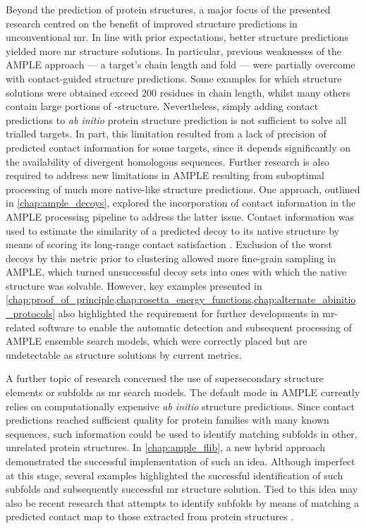Beyond the prediction of protein structures, a major focus of the presented research centred on the benefit of improved structure predictions in unconventional \gls{mr}. In line with prior expectations, better structure predictions yielded more \gls{mr} structure solutions. In particular, previous weaknesses of the AMPLE approach --- a target's chain length and fold --- were partially overcome with contact-guided structure predictions. Some examples for which structure solutions were obtained exceed 200 residues in chain length, whilst many others contain large portions of \textbeta-structure. Nevertheless, simply adding contact predictions to \textit{ab initio} protein structure prediction is not sufficient to solve all trialled targets. In part, this limitation resulted from a lack of precision of predicted contact information for some targets, since it depends significantly on the availability of divergent homologous sequences. Further research is also required to address new limitations in AMPLE resulting from suboptimal processing of much more native-like structure predictions. One approach, outlined in \cref{chap:ample_decoys}, explored the incorporation of contact information in the AMPLE processing pipeline to address the latter issue. Contact information was used to estimate the similarity of a predicted decoy to its native structure by means of scoring its long-range contact satisfaction \cite{Kosciolek2014-bt,De_Oliveira2016-gj,Adhikari2018-lj}. Exclusion of the worst decoys by this metric prior to clustering allowed more fine-grain sampling in AMPLE, which turned unsuccessful decoy sets into ones with which the native structure was solvable. However, key examples presented in \cref{chap:proof_of_principle,chap:rosetta_energy_functions,chap:alternate_abinitio_protocols} also highlighted the requirement for further developments in \gls{mr}-related software to enable the automatic detection and subsequent processing of AMPLE ensemble search models, which were correctly placed but are undetectable as structure solutions by current metrics.

A further topic of research concerned the use of supersecondary structure elements or subfolds as \gls{mr} search models. The default mode in AMPLE currently relies on computationally expensive \textit{ab initio} structure predictions. Since contact predictions reached sufficient quality for protein families with many known sequences, such information could be used to identify matching subfolds in other, unrelated protein structures. In \cref{chap:ample_flib}, a new hybrid approach demonstrated the successful implementation of such an idea. Although imperfect at this stage, several examples highlighted the successful identification of such subfolds and subsequently successful \gls{mr} structure solution. Tied to this idea may also be recent research that attempts to identify subfolds by means of matching a predicted contact map to those extracted from protein structures \cite{Buchan2017-ox,Ovchinnikov2017-nd}. 

